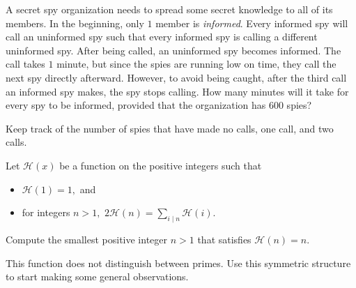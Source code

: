\documentclass[mast]{lucky}
\begin{document}
\begin{exam}
A secret spy organization needs to spread some secret knowledge to all of its members. In the beginning, only $1$ member is \textit{informed}. Every informed spy will call an uninformed spy such that every informed spy is calling a different uninformed spy. After being called, an uninformed spy becomes informed. The call takes $1$ minute, but since the spies are running low on time, they call the next spy directly afterward. However, to avoid being caught, after the third call an informed spy makes, the spy stops calling. How many minutes will it take for every spy to be informed, provided that the organization has $600$ spies?
\end{exam}

\begin{walk}
Keep track of the number of spies that have made no calls, one call, and two calls.
\end{walk}

\begin{exam}[NARML/9]
Let $\mathcal{H}(x)$ be a function on the positive integers such that
\begin{itemize}
\item $\mathcal{H}(1)=1,$ and
\item for integers $n>1,$ $2\mathcal{H}(n)=\sum\limits_{i\mid n}\mathcal{H}(i).$
\end{itemize}
Compute the smallest positive integer $n>1$ that satisfies $\mathcal{H}(n)=n.$
\end{exam}
\begin{walk}
This function does not distinguish between primes. Use this symmetric structure to start making some general observations.
\end{walk}
\end{document}
